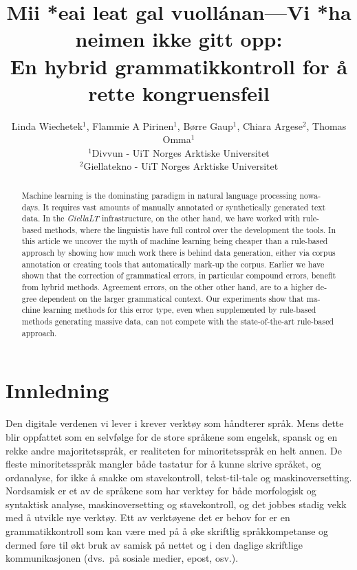 \documentclass{flammie}
\title{Mii *eai leat gal vuollánan---Vi *ha neimen ikke gitt opp: \\ En hybrid
grammatikkontroll for å rette kongruensfeil}
\author{Linda Wiechetek$^1$,  Flammie A Pirinen$^1$,  Børre Gaup$^1$,
Chiara Argese$^2$,  Thomas Omma$^1$\\
$^1$Divvun - UiT Norges Arktiske Universitet \\ $^2$Giellatekno - UiT Norges Arktiske Universitet}
\begin{document}
\setcounter{page}{287}
\maketitle

\begin{abstract}




\begin{english}

    Machine learning is the dominating paradigm in natural language processing
    nowadays.  It requires vast amounts of manually annotated or synthetically
    generated text data.  In the \textit{GiellaLT} infrastructure, on the other
    hand, we have worked with rule-based methods, where the linguistis have full
    control over the development the tools.  In this article we uncover the myth
    of machine learning being cheaper than a rule-based approach by showing how
    much work there is behind data generation, either via corpus annotation or
    creating tools that automatically mark-up the corpus.  Earlier we have shown
    that the correction of grammatical errors, in particular compound errors,
    benefit from hybrid methods.  Agreement errors, on the other other hand, are
    to a higher degree dependent on the larger grammatical context.  Our
    experiments show that machine learning methods for this error type, even
    when supplemented by rule-based methods generating massive data, can not
    compete with the state-of-the-art rule-based approach.

\end{english}

\end{abstract}

\section{Innledning}

Den digitale verdenen vi lever i krever verktøy som håndterer språk.  Mens dette
blir oppfattet som en selvfølge for de store språkene som engelsk, spansk og en
rekke andre majoritetsspråk, er realiteten for minoritetsspråk en helt annen.
De fleste minoritetsspråk mangler både tastatur for å kunne skrive språket, og
ordanalyse, for ikke å snakke om stavekontroll, tekst-til-tale og
maskinoversetting.  Nordsamisk er et av de språkene som har verktøy for både
morfologisk og syntaktisk analyse, maskinoversetting og stavekontroll, og det
jobbes stadig vekk med å utvikle nye verktøy.  Ett av verktøyene det er behov
for er en grammatikkontroll som kan være med på å øke skriftlig språkkompetanse
og dermed føre til økt bruk av samisk på nettet og i den daglige skriftlige
kommunikasjonen (dvs.\ på sosiale medier, epost, osv.).
\end{document}

